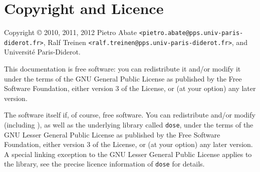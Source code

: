 
\section{Copyright and Licence}
\label{sec:copyright}
Copyright \copyright {} 2010, 2011, 2012
Pietro Abate \verb|<pietro.abate@pps.univ-paris-diderot.fr>|,
Ralf Treinen \verb|<ralf.treinen@pps.univ-paris-diderot.fr>|,
and Université Paris-Diderot.

This documentation is free software: you can redistribute it and/or
modify it under the terms of the GNU General Public License as
published by the Free Software Foundation, either version 3 of the
License, or (at your option) any later version.

The software itself if, of course, free software. You can redistribute
and/or modify \distcheck{} (including \debcheck), as well as the
underlying library called \texttt{dose}, under the terms of the GNU
Lesser General Public License as published by the Free Software
Foundation, either version 3 of the License, or (at your option) any
later version.  A special linking exception to the GNU Lesser General
Public License applies to the library, see the precise licence
information of \texttt{dose} for details.

